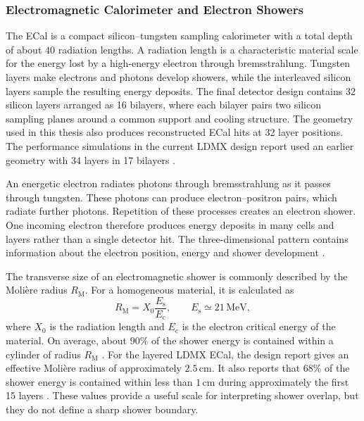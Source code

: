 \subsubsection{Electromagnetic Calorimeter and Electron Showers}

The ECal is a compact silicon--tungsten sampling calorimeter with a total
depth of about \(40\) radiation lengths. A radiation length is a
characteristic material scale for the energy lost by a high-energy electron
through bremsstrahlung. Tungsten layers make electrons and photons develop
showers, while the interleaved silicon layers sample the resulting energy
deposits. The final detector design contains 32 silicon layers arranged as
16 bilayers, where each bilayer pairs two silicon sampling planes around a
common support and cooling structure. The  geometry
used in this thesis also produces reconstructed ECal hits at 32 layer
positions. The performance simulations in the current LDMX design report
used an earlier geometry with 34 layers in 17 bilayers
\cite{ldmx2025-overview}.

An energetic electron radiates photons through \gls{bremsstrahlung} as it
passes through tungsten. These photons can produce electron--positron pairs,
which radiate further photons. Repetition of these processes creates an
\gls{electron shower}. One incoming electron therefore produces energy
deposits in many cells and layers rather than a single detector hit. The
three-dimensional pattern contains information about the electron position,
energy and shower development \cite{groom2024-passage-particles}.

The transverse size of an electromagnetic shower is commonly described by
the Molière radius \(R_{\mathrm{M}}\). For a homogeneous material, it is
calculated as
\begin{equation}
    R_{\mathrm{M}} = X_0\frac{E_{\mathrm{s}}}{E_{\mathrm{c}}},
    \qquad E_{\mathrm{s}} \simeq 21\,\mathrm{MeV},
    \label{eq:moliere_radius}
\end{equation}
where \(X_0\) is the radiation length and \(E_{\mathrm{c}}\) is the electron
critical energy of the material. On average, about \(90\%\) of the shower
energy is contained within a cylinder of radius \(R_{\mathrm{M}}\)
\cite{groom2024-passage-particles}. For the layered LDMX ECal, the design
report gives an effective Molière radius of approximately \(2.5\,\mathrm{cm}\).
It also reports that \(68\%\) of the shower energy is contained within less
than \(1\,\mathrm{cm}\) during approximately the first 15 layers
\cite{ldmx2025-overview}. These values provide a useful scale for interpreting
shower overlap, but they do not define a sharp shower boundary.

